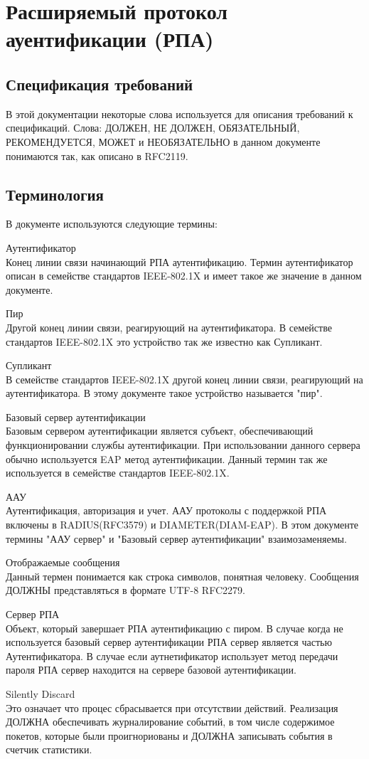 \section{Расширяемый протокол ауентификации (РПА)} %

\subsection{Спецификация требований}

В этой документации некоторые слова используется для описания требований к спецификаций. Слова: ДОЛЖЕН, НЕ ДОЛЖЕН, ОБЯЗАТЕЛЬНЫЙ, РЕКОМЕНДУЕТСЯ, МОЖЕТ и НЕОБЯЗАТЕЛЬНО в данном документе понимаются так, как описано в RFC2119.

\subsection{Терминология}

В документе используются следующие термины:

Аутентификатор \\ Конец линии связи начинающий РПА аутентификацию. Термин аутентификатор описан в семействе стандартов IEEE-802.1X и имеет такое же значение в данном документе.

Пир \\ Другой конец линии связи, реагирующий на аутентификатора. В семействе стандартов IEEE-802.1X это устройство так же известно как Супликант.

Супликант \\  В семействе стандартов IEEE-802.1X другой конец линии связи, реагирующий на аутентификатора. В этому документе такое устройство называется "пир".

Базовый сервер аутентификации \\ Базовым сервером аутентификации является субъект, обеспечивающий функционировании службы аутентификации. При использовании данного сервера обычно используется EAP метод аутентификации. Данный термин так же используется в семействе стандартов IEEE-802.1X.

ААУ \\ Аутентификация, авторизация и учет. ААУ протоколы с поддержкой РПА включены в RADIUS(RFC3579) и DIAMETER(DIAM-EAP). В этом документе термины "ААУ сервер" и "Базовый сервер аутентификации" взаимозаменяемы. %

Отображаемые сообщения \\ Данный термен понимается как строка символов, понятная человеку. Сообщения ДОЛЖНЫ представляться в формате UTF-8 RFC2279.

Сервер РПА \\ Объект, который завершает РПА аутентификацию с пиром. В случае когда не используется базовый сервер аутентификации РПА сервер является частью Аутентификатора. В случае если аутнетификатор использует метод передачи пароля РПА сервер находится на сервере базовой аутентификации.

Silently Discard \\ Это означает что процес сбрасывается при отсутствии действий. Реализация ДОЛЖНА обеспечивать журналирование событий, в том числе содержимое покетов, которые были проигнориованы и ДОЛЖНА записывать события в счетчик статистики.
